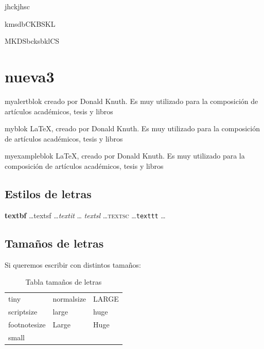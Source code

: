 \begin{definition}
jhckjhsc

kmsdbCKBSKL

MKDSbcksbklCS	
\end{definition}



\newpage

\section{nueva3}


\begin{myalertblock}{myalertblok}
	creado por Donald Knuth. Es muy utilizado para la composición de artículos académicos, tesis y libros
\end{myalertblock}


\begin{myblock}{myblok}
	\LaTeX{}, creado por Donald Knuth. Es muy utilizado para la composición de artículos académicos, tesis y libros
\end{myblock}



\begin{myexampleblock}{myexampleblok}
	\LaTeX{}, creado por Donald Knuth. Es muy utilizado para la composición de artículos académicos, tesis y libros
\end{myexampleblock}



\subsection{Estilos de letras}
\textbf{textbf} \dots \textsf{textsf} \dots \textit{textit} \dots
\textsl{textsl} \dots \textsc{textsc} \dots \texttt{texttt} \dots

\subsection{Tamaños de letras}
Si queremos escribir con distintos tamaños:
\begin{table}[htbp]
  \centering
  \begin{tabular}{lll}
    \tiny{tiny} & \normalsize{normalsize} & \LARGE{LARGE} \\
    \scriptsize{scriptsize} & \large{large} & \huge{huge} \\
    \footnotesize{footnotesize} & \Large{Large} & \Huge{Huge}\\
    \small{small}
  \end{tabular}
  \caption{Tabla tamaños de letras}
\end{table}

